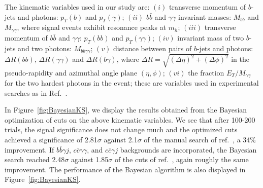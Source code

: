 
%


The  kinematic variables used in our  study are:
$(i)$ transverse momentum of $b$-jets and photons: $p_T(b)$ and $p_T(\gamma)$; 
$(ii)$ $b\bar{b}$ and $\gamma\gamma$ invariant masses: $M_{bb}$ and $M_{\gamma\gamma}$, where signal events exhibit resonance peaks at $m_h$;
$(iii)$ transverse momentum of $b\bar{b}$ and $\gamma\gamma$: $p_T(bb)$ and $p_T(\gamma\gamma)$; 
$(iv)$ invariant mass of two $b$-jets and two photons: $M_{bb\gamma\gamma}$;
$(v)$ distance between pairs of $b$-jets and photons: $\Delta R(bb)$, $\Delta R(\gamma\gamma)$ and $\Delta R(b\gamma)$, where
$\Delta R=\sqrt{(\Delta\eta)^2+(\Delta\phi)^2}$ in the pseudo-rapidity and azimuthal angle plane $(\eta,\phi)$;
$(vi)$ the fraction $E_T/M_{\gamma\gamma}$ for the two hardest photons in the event; these are variables used in experimental searches as in Ref.~\cite{Aad:2014yja, CMS}.

In Figure~\ref{fig:BayesianKS}, we display the results obtained from the Bayesian optimization of cuts on the above kinematic variables. We see that after 100-200 trials, the signal significance does not change much and the optimized cuts achieved a significance of 2.81$\sigma$ against 2.1$\sigma$ of the manual search of ref.~\cite{Azatov:2015oxa}, a 34\% improvement. If $b\bar{b}\gamma j$, $c\bar{c}\gamma\gamma$, and $c\bar{c}\gamma j$ backgrounds are incorporated, the Bayesian search reached 2.48$\sigma$ against 1.85$\sigma$ of the cuts of ref.~\cite{Azatov:2015oxa}, again roughly the same improvement. %
The performance of the Bayesian algorithm is also displayed in Figure~\ref{fig:BayesianKS}.

